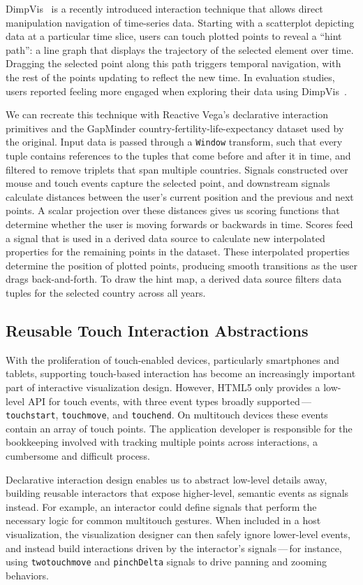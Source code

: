 DimpVis~\cite{kondo:dimpvis} is a recently introduced interaction technique that
allows direct manipulation navigation of time-series data. Starting with a
scatterplot depicting data at a particular time slice, users can touch plotted
points to reveal a ``hint path'': a line graph that displays the trajectory of
the selected element over time. Dragging the selected point along this path
triggers temporal navigation, with the rest of the points updating to reflect
the new time. In evaluation studies, users reported feeling more engaged when
exploring their data using DimpVis~\cite{kondo:dimpvis}.

We can recreate this technique with Reactive Vega's declarative interaction
primitives and the GapMinder country-fertility-life-expectancy dataset used by
the original. Input data is passed through a \texttt{Window} transform, such
that every tuple contains references to the tuples that come before and after it
in time, and filtered to remove triplets that span multiple countries. Signals
constructed over mouse and touch events capture the selected point, and
downstream signals calculate distances between the user's current position and
the previous and next points. A scalar projection over these distances gives us
scoring functions that determine whether the user is moving forwards or
backwards in time. Scores feed a signal that is used in a derived data source to
calculate new interpolated properties for the remaining points in the dataset.
These interpolated properties determine the position of plotted points,
producing smooth transitions as the user drags back-and-forth. To draw the hint
map, a derived data source filters data tuples for the selected country across
all years.

\subsection{Reusable Touch Interaction Abstractions}

With the proliferation of touch-enabled devices, particularly smartphones and
tablets, supporting touch-based interaction has become an increasingly important
part of interactive visualization design. However, HTML5 only provides a
low-level API for touch events, with three event types broadly
supported\,---\,\texttt{touchstart}, \texttt{touchmove}, and \texttt{touchend}.
On multitouch devices these events contain an array of touch points. The
application developer is responsible for the bookkeeping involved with tracking
multiple points across interactions, a cumbersome and difficult process.

Declarative interaction design enables us to abstract low-level details away,
building reusable interactors that expose higher-level, semantic events as
signals instead. For example, an interactor could define signals that perform
the necessary logic for common multitouch gestures. When included in a host
visualization, the visualization designer can then safely ignore lower-level
events, and instead build interactions driven by the interactor's
signals\,---\,for instance, using \texttt{twotouchmove} and \texttt{pinchDelta}
signals to drive panning and zooming behaviors.